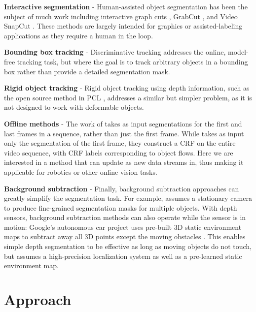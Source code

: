 \documentclass[graybox]{svmult}
\begin{document}
\textbf{Interactive segmentation} - Human-assisted object segmentation has been the subject of much work including interactive graph cuts \cite{boykov2001a}, GrabCut \cite{rother2004a}, and Video SnapCut \cite{bai2009a}.  These methods are largely intended for graphics or assisted-labeling applications as they require a human in the loop.

\textbf{Bounding box tracking} - Discriminative tracking \cite{grabner2006a, stalder2009a, kalal2010a} addresses the online, model-free tracking task, but where the goal is to track arbitrary objects in a bounding box rather than provide a detailed segmentation mask.

\textbf{Rigid object tracking} - Rigid object tracking using depth information, such as the open source method in PCL \cite{rusu2011a}, addresses a similar but simpler problem, as it is not designed to work with deformable objects.

\textbf{Offline methods} - The work of \cite{budvytis2011a} takes as input segmentations for the first and last frames in a sequence, rather than just the first frame.  While \cite{tsai2010a} takes as input only the segmentation of the first frame, they construct a CRF on the entire video sequence, with CRF labels corresponding to object flows.  Here we are interested in a method that can update as new data streams in, thus making it applicable for robotics or other online vision tasks.

\textbf{Background subtraction} - Finally, background subtraction approaches can greatly simplify the segmentation task.  For example, \cite{aeschliman2010a} assumes a stationary camera to produce fine-grained segmentation masks for multiple objects.  With depth sensors, background subtraction methods can also operate while the sensor is in motion: Google's autonomous car project uses pre-built 3D static environment maps to subtract away all 3D points except the moving obstacles \cite{urmson2011a}.  This enables simple depth segmentation to be effective as long as moving objects do not touch, but assumes a high-precision localization system as well as a pre-learned static environment map.

\section{Approach}
\end{document}
